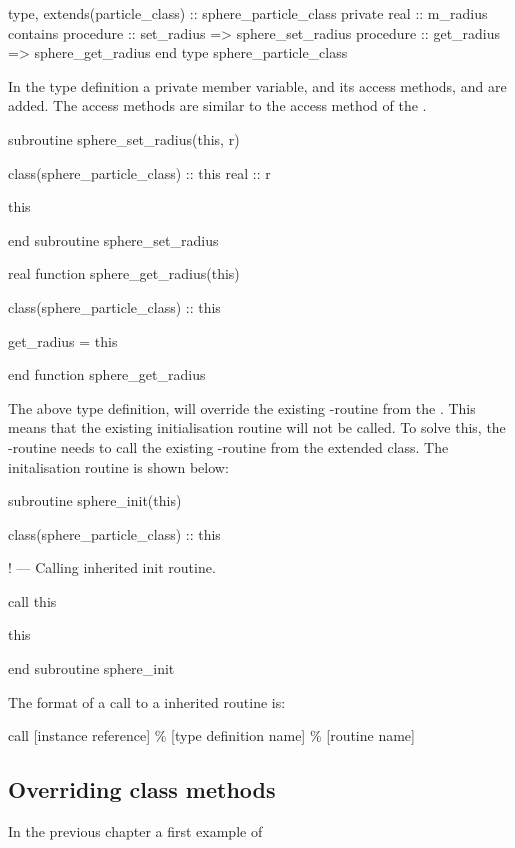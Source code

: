 \begin{fortrancodeenv}
type, extends(particle_class) :: sphere_particle_class
private
    real :: m_radius
contains
    procedure :: set_radius => sphere_set_radius
    procedure :: get_radius => sphere_get_radius
end type sphere_particle_class
\end{fortrancodeenv}

In the type definition a private member variable,  and its access methods,  and  are added. The access methods are similar to the access method of the .

\begin{fortrancodeenv}
subroutine sphere_set_radius(this, r)

    class(sphere_particle_class) :: this
    real :: r

    this %

end subroutine sphere_set_radius

real function sphere_get_radius(this)

    class(sphere_particle_class) :: this

    get_radius = this %

end function sphere_get_radius
\end{fortrancodeenv}

The above type definition, will override the existing -routine from the . This means that the existing initialisation routine will not be called. To solve this, the -routine needs to call the existing -routine from the extended class. The  initalisation routine is shown below:

\begin{fortrancodeenv}
subroutine sphere_init(this)

    class(sphere_particle_class) :: this

    ! --- Calling inherited init routine.

    call this %

    this %

end subroutine sphere_init
\end{fortrancodeenv}

The format of a call to a inherited routine is:

\begin{fsyntax}
call [instance reference] \% [type definition name] \% [routine name]
\end{fsyntax}

\subsection{Overriding class methods}

In the previous chapter a first example of

